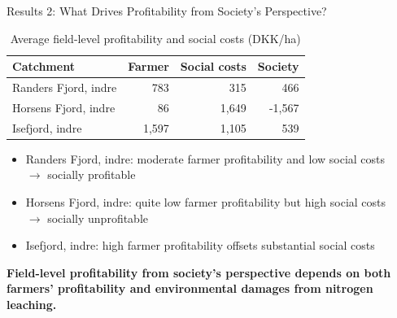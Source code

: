 \documentclass[t,24pt,aspectratio=169]{beamer}
\begin{document}
\begin{frame}{\vspace{-3ex}Results 2: What Drives Profitability from Society's Perspective?}

\vspace{-2ex} \begin{table}
\centering
\small
\caption{Average field-level profitability and social costs (DKK/ha)}
\begin{tabular}{lrrr}
\toprule
\textbf{Catchment}
&
\textbf{Farmer}
&
\textbf{Social costs}
&
\textbf{Society}
\\
\midrule

Randers Fjord, indre
& 783
& 315
& 466
\\

Horsens Fjord, indre
& 86
& 1,649
& -1,567
\\

Isefjord, indre
& 1,597
& 1,105
& 539
\\

\bottomrule
\end{tabular}
\end{table}



\begin{itemize}
    \item Randers Fjord, indre: moderate farmer profitability and low social costs \\ $\rightarrow$ socially profitable
    \item Horsens Fjord, indre: quite low farmer profitability but high social costs 
    \\ $\rightarrow$ socially unprofitable
    \item Isefjord, indre: high farmer profitability offsets substantial social costs
\end{itemize}
\vspace{1ex}


\centering
\textbf{Field-level profitability from society's perspective depends on both farmers' profitability and environmental damages from nitrogen leaching.}


\end{frame}
\end{document}
